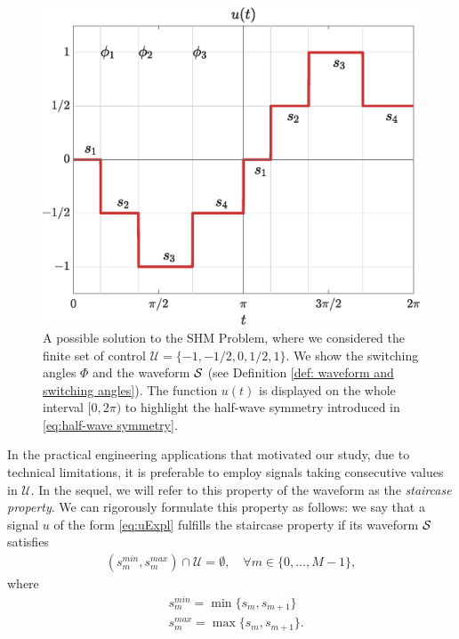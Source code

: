 \documentclass[twocolumn]{autart}    %
\begin{document}
\begin{figure}[h]
	\centering
	\includegraphics[scale=0.35]{img/fig01.eps} 
	\caption{A possible solution to the SHM Problem, where we considered the finite set of control $\mathcal{U} = \{-1, -1/2, 0, 1/2, 1\}$. We show the switching angles $\Phi$ and the waveform $\mathcal{S}$ (see Definition \ref{def: waveform and switching angles}). The function $u(t)$ is displayed on the whole interval $[0,2\pi)$ to highlight the half-wave symmetry introduced in \eqref{eq:half-wave symmetry}.}
	\label{fig:exampleSHE}
\end{figure}

In the practical engineering applications that motivated our study, due to technical limitations, it is preferable to employ signals taking consecutive values in $\mathcal{U}$. In the sequel, we will refer to this property of the waveform as the \emph{staircase property}. We can rigorously formulate this property as follows: we say that a signal $u$ of the form \eqref{eq:uExpl} fulfills the staircase property if its waveform $\mathcal{S}$ satisfies
\begin{gather}\label{eq:staircase prop}
	(s_m^{min},s_{m}^{max}) \cap \mathcal{U} = \emptyset, \quad \forall m\in \{ 0, \ldots, M-1 \},
\end{gather}
where 
\begin{align*}
	&s^{min}_m = \min\{s_m,s_{m+1}\} 
	\\[5pt]
	&s^{max}_m = \max\{s_m,s_{m+1}\}.
\end{align*}
\end{document}
